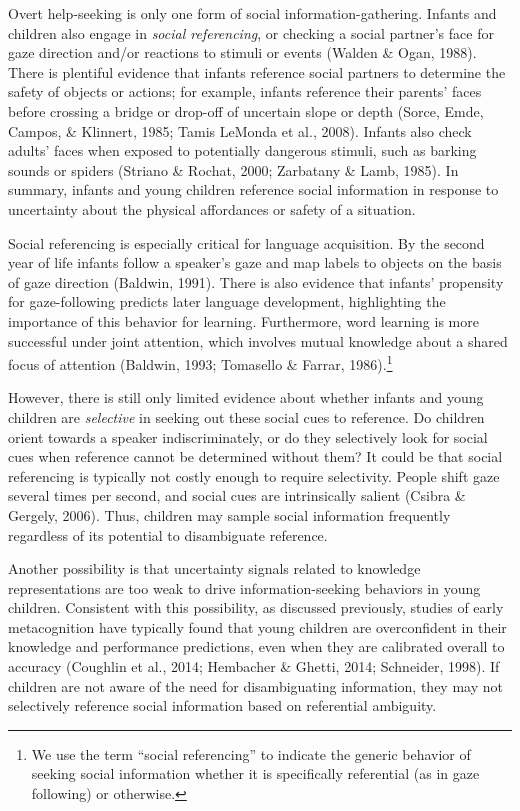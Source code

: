 \documentclass[english,man]{apa6}
\theoremstyle{definition}
\theoremstyle{definition}
\theoremstyle{definition}
\theoremstyle{remark}
\begin{document}
Overt help-seeking is only one form of social information-gathering.
Infants and children also engage in \emph{social referencing}, or
checking a social partner's face for gaze direction and/or reactions to
stimuli or events (Walden \& Ogan, 1988). There is plentiful evidence
that infants reference social partners to determine the safety of
objects or actions; for example, infants reference their parents' faces
before crossing a bridge or drop-off of uncertain slope or depth (Sorce,
Emde, Campos, \& Klinnert, 1985; Tamis LeMonda et al., 2008). Infants
also check adults' faces when exposed to potentially dangerous stimuli,
such as barking sounds or spiders (Striano \& Rochat, 2000; Zarbatany \&
Lamb, 1985). In summary, infants and young children reference social
information in response to uncertainty about the physical affordances or
safety of a situation.

Social referencing is especially critical for language acquisition. By
the second year of life infants follow a speaker's gaze and map labels
to objects on the basis of gaze direction (Baldwin, 1991). There is also
evidence that infants' propensity for gaze-following predicts later
language development, highlighting the importance of this behavior for
learning. Furthermore, word learning is more successful under joint
attention, which involves mutual knowledge about a shared focus of
attention (Baldwin, 1993; Tomasello \& Farrar, 1986).\footnote{We use
  the term \enquote{social referencing} to indicate the generic behavior
  of seeking social information whether it is specifically referential
  (as in gaze following) or otherwise.}

However, there is still only limited evidence about whether infants and
young children are \emph{selective} in seeking out these social cues to
reference. Do children orient towards a speaker indiscriminately, or do
they selectively look for social cues when reference cannot be
determined without them? It could be that social referencing is
typically not costly enough to require selectivity. People shift gaze
several times per second, and social cues are intrinsically salient
(Csibra \& Gergely, 2006). Thus, children may sample social information
frequently regardless of its potential to disambiguate reference.

Another possibility is that uncertainty signals related to knowledge
representations are too weak to drive information-seeking behaviors in
young children. Consistent with this possibility, as discussed
previously, studies of early metacognition have typically found that
young children are overconfident in their knowledge and performance
predictions, even when they are calibrated overall to accuracy (Coughlin
et al., 2014; Hembacher \& Ghetti, 2014; Schneider, 1998). If children
are not aware of the need for disambiguating information, they may not
selectively reference social information based on referential ambiguity.
\end{document}
